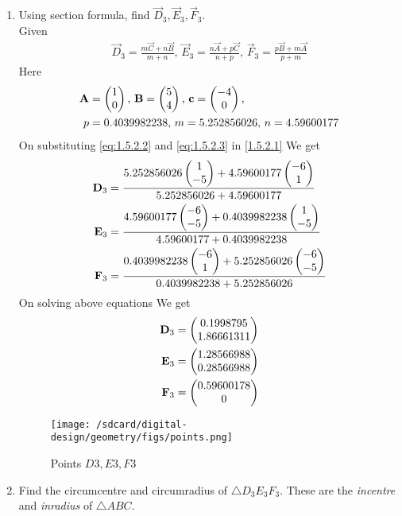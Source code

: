 \documentclass[11pt]{book}
\begin{document}
\begin{enumerate}[label=\thesection.\arabic*.,ref=\thesection.\theenumi]
\item Using section formula, find $\vec{D}_3, \vec{E}_3, \vec{F}_3$. \\
\solution Given
\begin{align}
			\vec{D}_3 = \frac{m\vec{C}+n\vec{B}}{m+n},\,
			\vec{E}_3 = \frac{n\vec{A}+p\vec{C}}{n+p},\,
			\vec{F}_3 = \frac{p\vec{B}+m\vec{A}}{p+m} \label{eq:1.5.2.1}
\end{align}
Here
\begin{align}
	\vec{A} &= \myvec{1 \\ 0},\,
	\vec{B} = \myvec{5\\4},\,
	\vec{c} = \myvec{-4\\0},\, \label{eq:1.5.2.2} \\
	p &= 0.4039982238,\,
	m = 5.252856026,\,
	n = 4.59600177  \label{eq:1.5.2.3}
\end{align}
On substituting \eqref{eq:1.5.2.2} and \eqref{eq:1.5.2.3} in \eqref{1.5.2.1} We get
\begin{align}
    \mathbf{D}_3 &= \frac{5.252856026\begin{pmatrix}1 \\ -5\end{pmatrix} + 4.59600177\begin{pmatrix}-6\\1\end{pmatrix}}{5.252856026+4.59600177 } \\
    \mathbf{E}_3 &= \frac{4.59600177\begin{pmatrix}-6 \\ -5\end{pmatrix} + 0.4039982238\begin{pmatrix}1\\-5\end{pmatrix}}{4.59600177+0.4039982238} \\
    \mathbf{F}_3 &= \frac{0.4039982238\begin{pmatrix}-6 \\ 1\end{pmatrix} + 5.252856026\begin{pmatrix}-6\\-5\end{pmatrix}}{0.4039982238+5.252856026}
\end{align}
On solving above equations We get 
\begin{align}
    \mathbf{D}_3 &= \begin{pmatrix}0.1998795  \\ 1.86661311\end{pmatrix} \\
    \mathbf{E}_3 &= \begin{pmatrix}1.28566988  \\ 0.28566988\end{pmatrix} \\
    \mathbf{F}_3 &= \begin{pmatrix}0.59600178  \\ 0\end{pmatrix} 
\end{align}
\begin{figure}[H]
\texttt{[image: /sdcard/digital-design/geometry/figs/points.png]}
\caption{Points $D3,E3,F3$}
\label{fig:fig1}
\end{figure}
\item Find the circumcentre and circumradius of $\triangle D_3E_3F_3$.  These are the {\em incentre} and {\em inradius} of $\triangle ABC$. \\

\end{enumerate}
\end{document}
